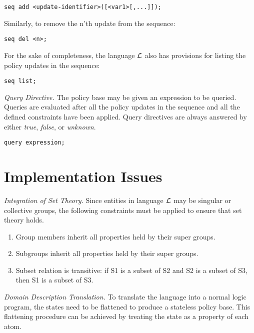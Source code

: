 \documentclass{llncs}
\begin{document}
    \begin{verbatim}seq add <update-identifier>([<var1>[,...]]);\end{verbatim}

    Similarly, to remove the n'th update from the sequence:

    \begin{verbatim}seq del <n>;\end{verbatim}

    For the sake of completeness, the language $\cal{L}$ also has provisions
    for listing the policy updates in the sequence:

    \begin{verbatim}seq list;\end{verbatim}

    \noindent
    \emph{Query Directive.} The policy base may be given an expression to be
    queried. Queries are evaluated after all the policy updates in the
    sequence and all the defined constraints have been applied. Query
    directives are always answered by either \emph{true}, \emph{false}, or
    \emph{unknown}.

    \begin{verbatim}query expression;\end{verbatim}

  \section{Implementation Issues}

    \noindent
    \emph{Integration of Set Theory.} Since entities in language $\cal{L}$ may 
    be singular or collective groups, the following constraints must be applied
    to ensure that set theory holds.

    \begin{enumerate} 
      \item
        Group members inherit all properties held by their super groups.
      \item
        Subgroups inherit all properties held by their super groups.
      \item
        Subset relation is transitive: if S1 is a subset of S2 and S2 is a
        subset of S3, then S1 is a subset of S3.
    \end{enumerate}

    \noindent
    \emph{Domain Description Translation.} To translate the language into a
    normal logic program, the states need to be flattened to produce a
    stateless policy base. This flattening procedure can be achieved by
    treating the state as a property of each atom.
\end{document}
